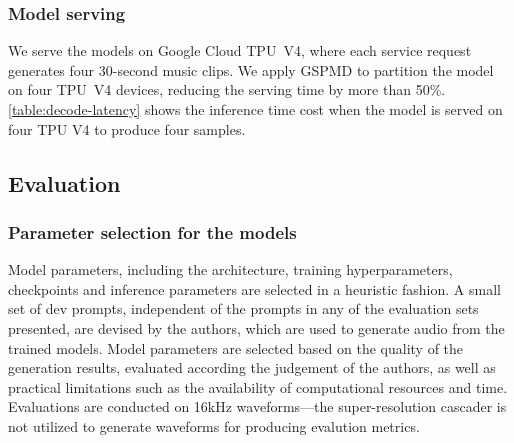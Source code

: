 \subsubsection{Model serving}
We serve the models on Google Cloud TPU~V4, where each service request generates four 30-second music clips. We apply GSPMD \cite{gspmd} to partition the model on four TPU~V4 devices, reducing the serving time by more than 50\%. \cref{table:decode-latency} shows the inference time cost when the model is served on four TPU V4 to produce four samples.

\begin{table}
\caption{Inference time cost on four TPU~V4 for four samples.}
\vskip 0.05in
  \label{table:decode-latency}
  \centering
\vskip-0.2in
\end{table}

\subsection{Evaluation}

\subsubsection{Parameter selection for the models}
\label{ss:model-parameter-selection}

Model parameters, including the architecture, training hyperparameters, checkpoints and inference parameters are selected in a heuristic fashion. A small set of dev prompts, independent of the prompts in any of the evaluation sets presented, are devised by the authors, which are used to generate audio from the trained models. Model parameters are selected based on the quality of the generation results, evaluated according the judgement of the authors, as well as practical limitations such as the availability of computational resources and time. Evaluations are conducted on 16kHz waveforms---the super-resolution cascader is not utilized to generate waveforms for producing evalution metrics.

